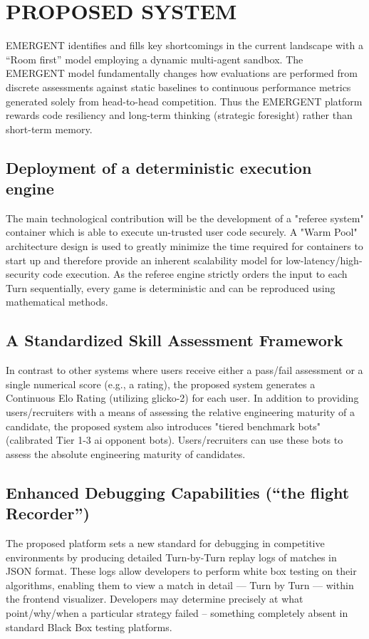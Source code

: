 \documentclass[12pt,a4paper]{report}
\begin{document}
\section {PROPOSED SYSTEM }EMERGENT identifies and fills key shortcomings in the current landscape with a “Room first” model employing a dynamic multi-agent sandbox. The EMERGENT model fundamentally changes how evaluations are performed from discrete assessments against static baselines to continuous performance metrics generated solely from head-to-head competition. Thus the EMERGENT platform rewards code resiliency and long-term thinking (strategic foresight) rather than short-term memory.
\subsection {Deployment of a deterministic execution engine}The main technological contribution will be the development of a "referee system" container which is able to execute un-trusted user code securely. A "Warm Pool" architecture design is used to greatly minimize the time required for containers to start up and therefore provide an inherent scalability model for low-latency/high-security code execution. As the referee engine strictly orders the input to each Turn sequentially, every game is deterministic and can be reproduced using mathematical methods.
\subsection {A Standardized Skill Assessment Framework}In contrast to other systems where users receive either a pass/fail assessment or a single numerical score (e.g., a rating), the proposed system generates a Continuous Elo Rating (utilizing glicko-2) for each user. In addition to providing users/recruiters with a means of assessing the relative engineering maturity of a candidate, the proposed system also introduces "tiered benchmark bots" (calibrated Tier 1-3 ai opponent bots). Users/recruiters can use these bots to assess the absolute engineering maturity of candidates.
\subsection {Enhanced Debugging Capabilities (“the flight Recorder”) }The proposed platform sets a new standard for debugging in competitive environments by producing detailed Turn-by-Turn replay logs of matches in JSON format. These logs allow developers to perform white box testing on their algorithms, enabling them to view a match in detail — Turn by Turn — within the frontend visualizer. Developers may determine precisely at what point/why/when a particular strategy failed – something completely absent in standard Black Box testing platforms.
\end{document}
